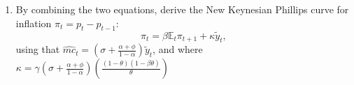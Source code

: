 \documentclass[dvipsnames,11pt]{article}
\begin{document}
\begin{enumerate}
\begin{solution}
Similarly, take the price-level equation for period $t-1$:
\[
p_{t-1}=(1-\theta)\sum_{\ell=0}^\infty \theta^\ell p_{t-1-\ell}^*.
\]
Then:
\begin{align*}
    p_{t}&=(1-\theta)\sum_{\ell=0}^\infty \theta^\ell p_{t-\ell}^* \\
    &= (1-\theta) p_t^*+(1-\theta) \sum_{\ell=1}^\infty \theta^\ell p_{t-\ell}^* \\
    &= (1-\theta)p_t^*+(1-\theta)\sum_{\ell=0}^\infty \theta^{\ell+1}p_{t-1-\ell}^* \\
    &= (1-\theta)p_t^*+\theta (1-\theta)\sum_{\ell=0}^\infty \theta^{\ell}p_{t-1-\ell}^* \\
    &= (1-\theta)p_t^*+\theta p_{t-1}.
\end{align*}
                
                
            \end{solution}
    
        \item By combining the two equations, derive the New Keynesian Phillips curve for inflation $\pi_t = p_t - p_{t-1}$:
        \[
        \pi_t = \beta \mathbb{E}_t \pi_{t+1} + \kappa \widetilde{y}_t,
        \]
        using that $\widehat{mc}_t = \left( \sigma + \frac{\alpha + \phi}{1 - \alpha}  \right) \widetilde{y}_t$, and where $\kappa = \gamma \left( \sigma + \frac{\alpha + \phi}{1 - \alpha}  \right) \left( \frac{(1 - \theta)(1 - \beta \theta)}{\theta}    \right)$
    

\end{enumerate}
\end{document}
